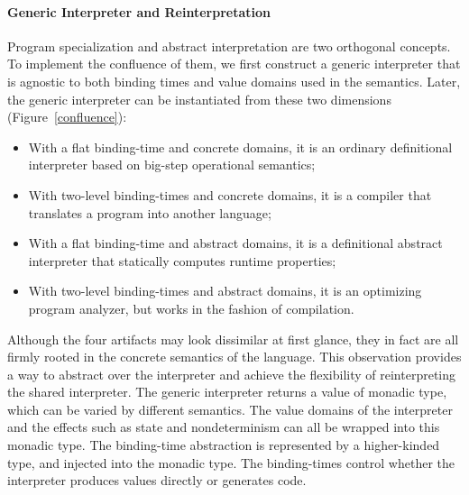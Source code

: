 \paragraph{Generic Interpreter and Reinterpretation}

Program specialization and abstract interpretation are two orthogonal
concepts.  To implement the confluence of them, we first construct a
generic interpreter that is agnostic to both binding times and value
domains used in the semantics.  Later, the generic interpreter can be
instantiated from these two dimensions (Figure~\ref{confluence}):
\begin{itemize}
\item With a flat binding-time and concrete domains, it is an ordinary
  definitional interpreter based on big-step operational semantics;
\item With two-level binding-times and concrete domains, it is a
  compiler that translates a program into another language;
\item With a flat binding-time and abstract domains, it is a
  definitional abstract interpreter \cite{DBLP:journals/pacmpl/DaraisLNH17}
  that statically computes runtime properties;
\item With two-level binding-times and abstract domains, it is an optimizing
  program analyzer, but works in the fashion of compilation.
\end{itemize}

Although the four artifacts may look dissimilar at first glance, they in
fact are all firmly rooted in the concrete semantics of the language.  This
observation provides a way to abstract over the interpreter and achieve the
flexibility of reinterpreting the shared interpreter.  The generic interpreter
returns a value of monadic type, which can be varied by different semantics.
The value domains of the interpreter and the effects such as state and nondeterminism
can all be wrapped into this monadic type.  The binding-time abstraction is
represented by a higher-kinded type, and injected into the monadic type.  The
binding-times control whether the interpreter produces values directly or
generates code. 


